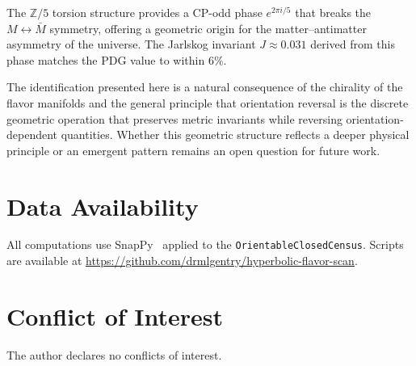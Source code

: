 \documentclass[12pt]{article}
\theoremstyle{definition}
\begin{document}
The $\mathbb{Z}/5$ torsion structure provides a CP-odd phase
$e^{2\pi i/5}$ that breaks the $M \leftrightarrow \bar{M}$ symmetry,
offering a geometric origin for the matter--antimatter asymmetry of
the universe. The Jarlskog invariant $J \approx 0.031$ derived from
this phase matches the PDG value to within $6\%$.

The identification presented here is a natural consequence of the
chirality of the flavor manifolds and the general principle that
orientation reversal is the discrete geometric operation that preserves
metric invariants while reversing orientation-dependent quantities.
Whether this geometric structure reflects a deeper physical principle
or an emergent pattern remains an open question for future work.

\section*{Data Availability}
All computations use SnapPy~\cite{SnapPy} applied to the
\texttt{OrientableClosedCensus}. Scripts are available at
\url{https://github.com/drmlgentry/hyperbolic-flavor-scan}.

\section*{Conflict of Interest}
The author declares no conflicts of interest.
\end{document}

